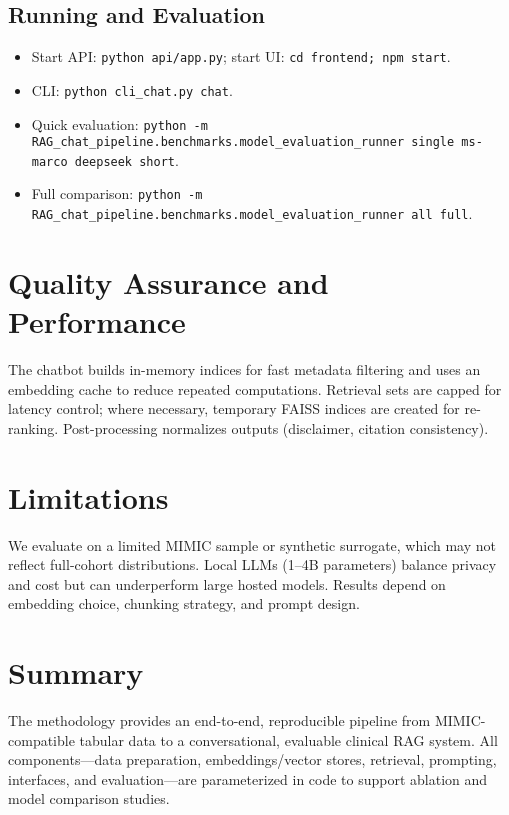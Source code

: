 \subsection{Running and Evaluation}
\begin{itemize}
  \item Start API: \texttt{python api/app.py}; start UI: \texttt{cd frontend; npm start}.
  \item CLI: \texttt{python cli\_chat.py chat}.
  \item Quick evaluation: \texttt{python -m RAG\_chat\_pipeline.benchmarks.model\_evaluation\_runner single ms-marco deepseek short}.
  \item Full comparison: \texttt{python -m RAG\_chat\_pipeline.benchmarks.model\_evaluation\_runner all full}.
\end{itemize}

\section{Quality Assurance and Performance}
The chatbot builds in-memory indices for fast metadata filtering and uses an embedding cache to reduce repeated computations. Retrieval sets are capped for latency control; where necessary, temporary FAISS indices are created for re-ranking. Post-processing normalizes outputs (disclaimer, citation consistency).

\section{Limitations}
We evaluate on a limited MIMIC sample or synthetic surrogate, which may not reflect full-cohort distributions. Local LLMs (1--4B parameters) balance privacy and cost but can underperform large hosted models. Results depend on embedding choice, chunking strategy, and prompt design.

\section{Summary}
The methodology provides an end-to-end, reproducible pipeline from MIMIC-compatible tabular data to a conversational, evaluable clinical RAG system. All components---data preparation, embeddings/vector stores, retrieval, prompting, interfaces, and evaluation---are parameterized in code to support ablation and model comparison studies.\par